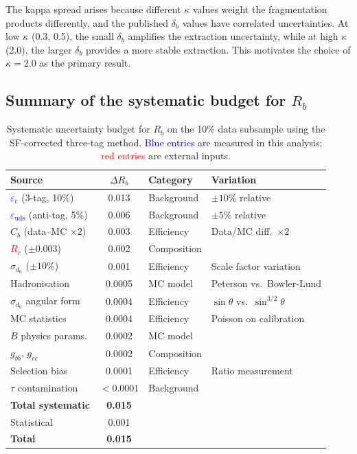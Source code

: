 \documentclass[11pt,a4paper]{article}
\newcommand{\measured}[1]{\textcolor{blue}{#1}}
\newcommand{\external}[1]{\textcolor{red}{#1}}
\begin{document}
The kappa spread arises because different $\kappa$ values weight
the fragmentation products differently, and the published
$\delta_b$ values have correlated uncertainties.
At low $\kappa$ (0.3, 0.5), the small $\delta_b$ amplifies the
extraction uncertainty, while at high $\kappa$ (2.0), the larger
$\delta_b$ provides a more stable extraction.
This motivates the choice of $\kappa = 2.0$ as the primary
result.

\subsection{Summary of the systematic budget for $R_b$}
\label{sec:syst-summary}

\begin{table}[htbp]
\centering
\caption{Systematic uncertainty budget for $R_b$ on the 10\%
data subsample using the SF-corrected three-tag method.
\measured{Blue entries} are measured in this analysis;
\external{red entries} are external inputs.}
\label{tbl:syst_rb}
\begin{tabular}{lcll}
\toprule
Source & $\Delta R_b$ & Category & Variation \\
\midrule
\measured{$\varepsilon_c$} (3-tag, 10\%) & 0.013 & Background & $\pm 10\%$ relative \\
\measured{$\varepsilon_\text{uds}$} (anti-tag, 5\%) & 0.006 & Background & $\pm 5\%$ relative \\
$C_b$ (data--MC $\times 2$) & 0.003 & Efficiency & Data/MC diff.\ $\times 2$ \\
\external{$R_c$} ($\pm 0.003$) & 0.002 & Composition & \cite{LEP:EWWG:2005} \\
$\sigma_{d_0}$ ($\pm 10\%$) & 0.001 & Efficiency & Scale factor variation \\
Hadronisation & 0.0005 & MC model & Peterson vs.\ Bowler-Lund \\
$\sigma_{d_0}$ angular form & 0.0004 & Efficiency & $\sin\theta$ vs.\ $\sin^{3/2}\theta$ \\
MC statistics & 0.0004 & Efficiency & Poisson on calibration \\
$B$ physics params. & 0.0002 & MC model & \cite{PDG:2024} \\
$g_{b\bar{b}}$, $g_{c\bar{c}}$ & 0.0002 & Composition & \cite{ALEPH:gbb,LEP:gcc} \\
Selection bias & 0.0001 & Efficiency & Ratio measurement \\
$\tau$ contamination & $< 0.0001$ & Background & \cite{ALEPH:sigma_had} \\
\midrule
\textbf{Total systematic} & \textbf{0.015} & & \\
Statistical & 0.001 & & \\
\textbf{Total} & \textbf{0.015} & & \\
\bottomrule
\end{tabular}
\end{table}
\end{document}
